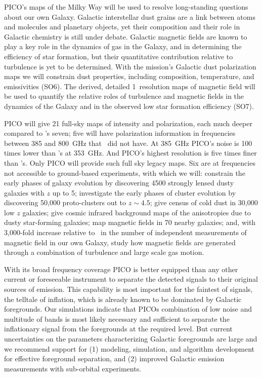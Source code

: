 \documentclass[PICOReport.tex]{subfiles}
\begin{document}

PICO's maps of the Milky Way will be used to resolve long-standing questions about our own Galaxy. Galactic interstellar dust grains are a link between atoms and molecules and planetary objects, yet their composition and their role in Galactic chemistry is still under debate. Galactic magnetic fields are known to play a key role in the dynamics of gas in the Galaxy, and in determining the efficiency of star formation, but their quantitative contribution relative to turbulence is yet to be determined. With the mission's Galactic dust polarization maps we will constrain dust properties, including composition, temperature, and emissivities (SO6). The derived, detailed 1\arcmin\ resolution maps of magnetic field will be used to quantify the relative roles of turbulence and magnetic fields in the dynamics of the Galaxy and in the observed low star formation efficiency (SO7). 

PICO will give 21 full-sky maps of intensity and polarization, each much deeper compared to \planck 's seven; five will have polarization information in frequencies between 385 and 800~GHz that \planck\ did not have. At 385~GHz PICO's noise is 100 times lower than \planck 's at 353~GHz. And PICO's highest resolution is five times finer than \planck 's. Only PICO will provide such full sky legacy maps. Six are at frequencies not accessible to ground-based experiments, with which we will: constrain the early phases of galaxy evolution by discovering 4500 strongly lensed dusty galaxies with $z$ up to 5; investigate the early phases of cluster evolution by discovering 50,000 proto-clusters out to $z\sim4.5$; give census of cold dust in 30,000 low $z$ galaxies; give cosmic infrared background maps of the anisotropies due to dusty star-forming galaxies; map magnetic fields in 70 nearby galaxies; and, with 3,000-fold increase relative to \planck\ in the number of independent measurements of magnetic field in our own Galaxy, study how magnetic fields are generated through a combination of turbulence and large scale gas motion. 


With its broad frequency coverage PICO is better equipped than any other current or foreseeable instrument to separate the detected signals to their original sources of emission.  This capability is most important for the faintest of signals, the telltale of inflation, which is already known to be dominated by Galactic foregrounds. Our simulations indicate that PICOs combination of low noise and multitude of bands is most likely necessary and sufficient to separate the inflationary signal from the foregrounds at the required level. But current uncertainties on the parameters characterizing Galactic foregrounds are large and we recommend support for (1) modeling, simulation, and algorithm development for effective foreground separation, and (2) improved Galactic emission measurements with sub-orbital experiments. 
\end{document}
